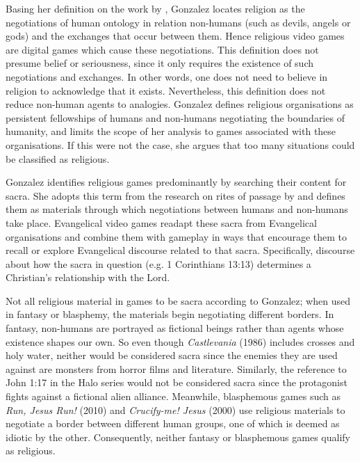 Basing her definition on the work by \textcite{chidester_authentic_2005}, Gonzalez locates religion as the negotiations of human ontology in relation non-humans (such as devils, angels or gods) and the exchanges that occur between them. Hence religious video games are digital games which cause these negotiations. This definition does not presume belief or seriousness, since it only requires the existence of such negotiations and exchanges. In other words, one does not need to believe in religion to acknowledge that it exists. Nevertheless, this definition does not reduce non-human agents to analogies. Gonzalez defines religious organisations as persistent fellowships of humans and non-humans negotiating the boundaries of humanity, and limits the scope of her analysis to games associated with these organisations. If this were not the case, she argues that too many situations could be classified as religious.
 
Gonzalez identifies religious games predominantly by searching their content for sacra. She adopts this term from the research on rites of passage by \textcite{turner_forest_1967} and defines them as materials through which negotiations between humans and non-humans take place. Evangelical video games readapt these sacra from Evangelical organisations and combine them with gameplay in ways that encourage them to recall or explore Evangelical discourse related to that sacra. Specifically, discourse about how the sacra in question (e.g. 1 Corinthians 13:13) determines a Christian’s relationship with the Lord.


Not all religious material in games to be sacra according to Gonzalez; when used in fantasy or blasphemy, the materials begin negotiating different borders. In fantasy, non-humans are portrayed as fictional beings rather than agents whose existence shapes our own. So even though \textit{Castlevania} (1986) includes crosses and holy water, neither would be considered sacra since the enemies they are used against are monsters from horror films and literature. Similarly, the reference to John 1:17 in the Halo series would not be considered sacra since the protagonist fights against a fictional alien alliance. Meanwhile, blasphemous games such as \textit{Run, Jesus Run!} (2010) and \textit{Crucify-me! Jesus} (2000) use religious materials to negotiate a border between different human groups, one of which is deemed as idiotic by the other. Consequently, neither fantasy or blasphemous games qualify as religious.

